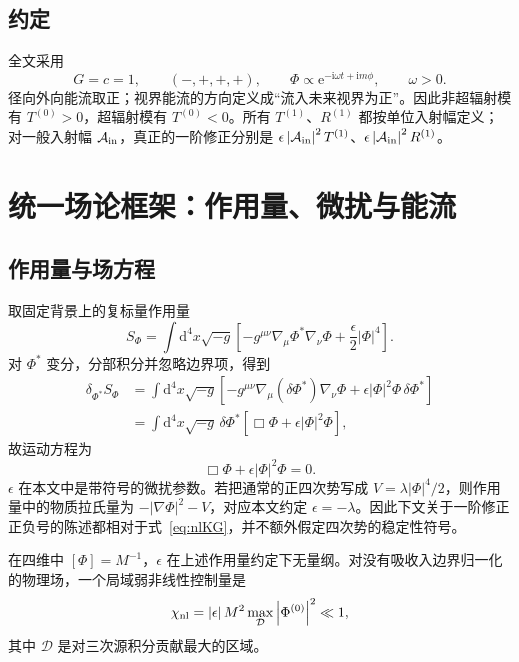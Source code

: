 \documentclass[UTF8,fontset=fandol,11pt,a4paper]{ctexart}
\newcommand{\dd}{\mathrm d}
\newcommand{\ii}{\mathrm i}
\newcommand{\ee}{\mathrm e}
\newcommand{\abs}[1]{\left|#1\right|}
\begin{document}
\subsection{约定}

全文采用
\begin{equation}
G=c=1,\qquad (-,+,+,+),\qquad
\Phi\propto \ee^{-\ii\omega t+\ii m\phi},\qquad \omega>0.
\end{equation}
径向外向能流取正；视界能流的方向定义成“流入未来视界为正”。因此非超辐射模有 $T^{(0)}>0$，超辐射模有 $T^{(0)}<0$。所有 $T^{(1)}$、$R^{(1)}$ 都按单位入射幅定义；对一般入射幅 $\mathcal A_{\rm in}$，真正的一阶修正分别是 $\epsilon\abs{\mathcal A_{\rm in}}^2T^{(1)}$、$\epsilon\abs{\mathcal A_{\rm in}}^2R^{(1)}$。

\section{统一场论框架：作用量、微扰与能流}
\label{sec:field-theory}

\subsection{作用量与场方程}

取固定背景上的复标量作用量
\begin{equation}
S_\Phi=\int \dd^4x\sqrt{-g}\left[
-g^{\mu\nu}\nabla_\mu\Phi^*\nabla_\nu\Phi
+\frac{\epsilon}{2}\abs{\Phi}^4\right].
\label{eq:action}
\end{equation}
对 $\Phi^*$ 变分，分部积分并忽略边界项，得到
\begin{align}
\delta_{\Phi^*}S_\Phi
&=\int\dd^4x\sqrt{-g}\left[
-g^{\mu\nu}\nabla_\mu(\delta\Phi^*)\nabla_\nu\Phi
+\epsilon\abs{\Phi}^2\Phi\,\delta\Phi^*\right]\nonumber\\
&=\int\dd^4x\sqrt{-g}\,\delta\Phi^*
\left[\Box\Phi+\epsilon\abs{\Phi}^2\Phi\right],
\end{align}
故运动方程为
\begin{equation}
\boxed{\Box\Phi+\epsilon\abs{\Phi}^2\Phi=0.}
\label{eq:nlKG}
\end{equation}
$\epsilon$ 在本文中是带符号的微扰参数。若把通常的正四次势写成 $V=\lambda\abs{\Phi}^4/2$，则作用量中的物质拉氏量为 $-\abs{\nabla\Phi}^2-V$，对应本文约定 $\epsilon=-\lambda$。因此下文关于一阶修正正负号的陈述都相对于式~\eqref{eq:nlKG}，并不额外假定四次势的稳定性符号。

在四维中 $[\Phi]=M^{-1}$，$\epsilon$ 在上述作用量约定下无量纲。对没有吸收入边界归一化的物理场，一个局域弱非线性控制量是
\begin{equation}
\chi_{\rm nl}=\abs{\epsilon}M^2
\max_{\mathcal D}\abs{\Phi^{(0)}}^2\ll1,
\label{eq:chi}
\end{equation}
其中 $\mathcal D$ 是对三次源积分贡献最大的区域。
\end{document}
